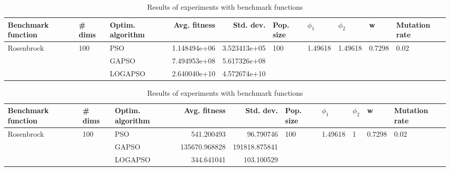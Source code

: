 \documentclass{article}
\begin{document}
\begin{table}
\centering
\caption{Results of experiments with benchmark functions}
\begin{tabular}{lllrrlllll}
\toprule
         Benchmark function &              \# dims & Optim. algorithm &  Avg. fitness &    Std. dev. &            Pop. size &               $\phi_{1}$ &               $\phi_{2}$ &                       w &         Mutation rate \\
\midrule
\multirow{3}{*}{Rosenbrock} & \multirow{3}{*}{100} &              PSO &  1.148494e+06 & 3.523413e+05 & \multirow{3}{*}{100} & \multirow{3}{*}{1.49618} & \multirow{3}{*}{1.49618} & \multirow{3}{*}{0.7298} & \multirow{3}{*}{0.02} \\
                            &                      &            GAPSO &  7.494953e+08 & 5.617326e+08 &                      &                          &                          &                         &                       \\
                            &                      &          LOGAPSO &  2.640040e+10 & 4.572674e+10 &                      &                          &                          &                         &                       \\
\bottomrule
\end{tabular}
\end{table}
\begin{table}
\centering
\caption{Results of experiments with benchmark functions}
\begin{tabular}{lllrrlllll}
\toprule
         Benchmark function &              \# dims & Optim. algorithm &  Avg. fitness &     Std. dev. &            Pop. size &               $\phi_{1}$ &         $\phi_{2}$ &                       w &         Mutation rate \\
\midrule
\multirow{3}{*}{Rosenbrock} & \multirow{3}{*}{100} &              PSO &    541.200493 &     96.790746 & \multirow{3}{*}{100} & \multirow{3}{*}{1.49618} & \multirow{3}{*}{1} & \multirow{3}{*}{0.7298} & \multirow{3}{*}{0.02} \\
                            &                      &            GAPSO & 135670.968828 & 191818.875841 &                      &                          &                    &                         &                       \\
                            &                      &          LOGAPSO &    344.641041 &    103.100529 &                      &                          &                    &                         &                       \\
\bottomrule
\end{tabular}
\end{table}
\end{document}

